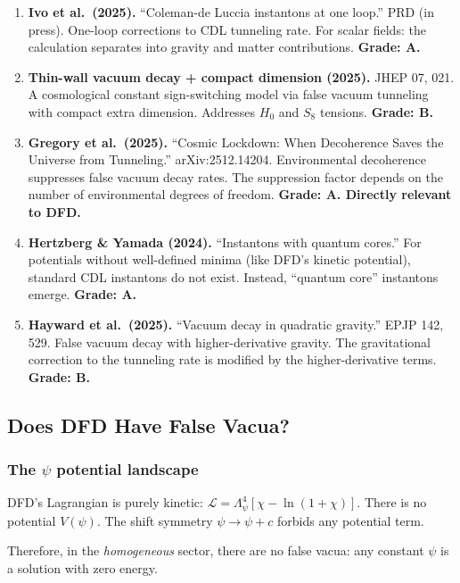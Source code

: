 \documentclass[11pt,a4paper]{article}
\begin{document}
\begin{enumerate}
\item \textbf{Ivo et al.\ (2025).} ``Coleman-de Luccia instantons at one loop.'' PRD (in press). One-loop corrections to CDL tunneling rate. For scalar fields: the calculation separates into gravity and matter contributions. \textbf{Grade: A.}

\item \textbf{Thin-wall vacuum decay + compact dimension (2025).} JHEP 07, 021. A cosmological constant sign-switching model via false vacuum tunneling with compact extra dimension. Addresses $H_0$ and $S_8$ tensions. \textbf{Grade: B.}

\item \textbf{Gregory et al.\ (2025).} ``Cosmic Lockdown: When Decoherence Saves the Universe from Tunneling.'' arXiv:2512.14204. Environmental decoherence suppresses false vacuum decay rates. The suppression factor depends on the number of environmental degrees of freedom. \textbf{Grade: A. Directly relevant to DFD.}

\item \textbf{Hertzberg \& Yamada (2024).} ``Instantons with quantum cores.'' For potentials without well-defined minima (like DFD's kinetic potential), standard CDL instantons do not exist. Instead, ``quantum core'' instantons emerge. \textbf{Grade: A.}

\item \textbf{Hayward et al.\ (2025).} ``Vacuum decay in quadratic gravity.'' EPJP 142, 529. False vacuum decay with higher-derivative gravity. The gravitational correction to the tunneling rate is modified by the higher-derivative terms. \textbf{Grade: B.}
\end{enumerate}

\subsection{Does DFD Have False Vacua?}

\subsubsection{The $\psi$ potential landscape}

DFD's Lagrangian is purely kinetic: $\mathcal{L} = \Lambda_\psi^4[\chi - \ln(1+\chi)]$. There is no potential $V(\psi)$. The shift symmetry $\psi \to \psi + c$ forbids any potential term.

Therefore, in the \emph{homogeneous} sector, there are no false vacua: any constant $\psi$ is a solution with zero energy.
\end{document}
